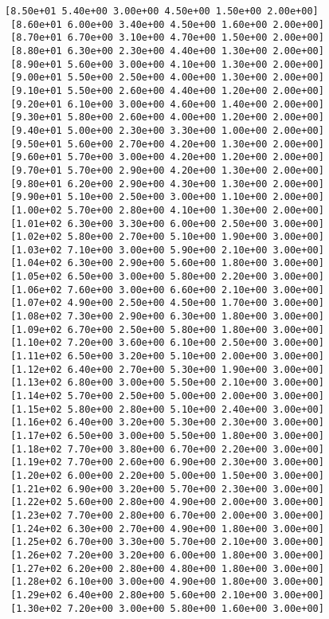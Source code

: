 \documentclass[11pt]{article}
\begin{document}
\begin{Verbatim}[commandchars=\\\{\}]
 [8.50e+01 5.40e+00 3.00e+00 4.50e+00 1.50e+00 2.00e+00]
 [8.60e+01 6.00e+00 3.40e+00 4.50e+00 1.60e+00 2.00e+00]
 [8.70e+01 6.70e+00 3.10e+00 4.70e+00 1.50e+00 2.00e+00]
 [8.80e+01 6.30e+00 2.30e+00 4.40e+00 1.30e+00 2.00e+00]
 [8.90e+01 5.60e+00 3.00e+00 4.10e+00 1.30e+00 2.00e+00]
 [9.00e+01 5.50e+00 2.50e+00 4.00e+00 1.30e+00 2.00e+00]
 [9.10e+01 5.50e+00 2.60e+00 4.40e+00 1.20e+00 2.00e+00]
 [9.20e+01 6.10e+00 3.00e+00 4.60e+00 1.40e+00 2.00e+00]
 [9.30e+01 5.80e+00 2.60e+00 4.00e+00 1.20e+00 2.00e+00]
 [9.40e+01 5.00e+00 2.30e+00 3.30e+00 1.00e+00 2.00e+00]
 [9.50e+01 5.60e+00 2.70e+00 4.20e+00 1.30e+00 2.00e+00]
 [9.60e+01 5.70e+00 3.00e+00 4.20e+00 1.20e+00 2.00e+00]
 [9.70e+01 5.70e+00 2.90e+00 4.20e+00 1.30e+00 2.00e+00]
 [9.80e+01 6.20e+00 2.90e+00 4.30e+00 1.30e+00 2.00e+00]
 [9.90e+01 5.10e+00 2.50e+00 3.00e+00 1.10e+00 2.00e+00]
 [1.00e+02 5.70e+00 2.80e+00 4.10e+00 1.30e+00 2.00e+00]
 [1.01e+02 6.30e+00 3.30e+00 6.00e+00 2.50e+00 3.00e+00]
 [1.02e+02 5.80e+00 2.70e+00 5.10e+00 1.90e+00 3.00e+00]
 [1.03e+02 7.10e+00 3.00e+00 5.90e+00 2.10e+00 3.00e+00]
 [1.04e+02 6.30e+00 2.90e+00 5.60e+00 1.80e+00 3.00e+00]
 [1.05e+02 6.50e+00 3.00e+00 5.80e+00 2.20e+00 3.00e+00]
 [1.06e+02 7.60e+00 3.00e+00 6.60e+00 2.10e+00 3.00e+00]
 [1.07e+02 4.90e+00 2.50e+00 4.50e+00 1.70e+00 3.00e+00]
 [1.08e+02 7.30e+00 2.90e+00 6.30e+00 1.80e+00 3.00e+00]
 [1.09e+02 6.70e+00 2.50e+00 5.80e+00 1.80e+00 3.00e+00]
 [1.10e+02 7.20e+00 3.60e+00 6.10e+00 2.50e+00 3.00e+00]
 [1.11e+02 6.50e+00 3.20e+00 5.10e+00 2.00e+00 3.00e+00]
 [1.12e+02 6.40e+00 2.70e+00 5.30e+00 1.90e+00 3.00e+00]
 [1.13e+02 6.80e+00 3.00e+00 5.50e+00 2.10e+00 3.00e+00]
 [1.14e+02 5.70e+00 2.50e+00 5.00e+00 2.00e+00 3.00e+00]
 [1.15e+02 5.80e+00 2.80e+00 5.10e+00 2.40e+00 3.00e+00]
 [1.16e+02 6.40e+00 3.20e+00 5.30e+00 2.30e+00 3.00e+00]
 [1.17e+02 6.50e+00 3.00e+00 5.50e+00 1.80e+00 3.00e+00]
 [1.18e+02 7.70e+00 3.80e+00 6.70e+00 2.20e+00 3.00e+00]
 [1.19e+02 7.70e+00 2.60e+00 6.90e+00 2.30e+00 3.00e+00]
 [1.20e+02 6.00e+00 2.20e+00 5.00e+00 1.50e+00 3.00e+00]
 [1.21e+02 6.90e+00 3.20e+00 5.70e+00 2.30e+00 3.00e+00]
 [1.22e+02 5.60e+00 2.80e+00 4.90e+00 2.00e+00 3.00e+00]
 [1.23e+02 7.70e+00 2.80e+00 6.70e+00 2.00e+00 3.00e+00]
 [1.24e+02 6.30e+00 2.70e+00 4.90e+00 1.80e+00 3.00e+00]
 [1.25e+02 6.70e+00 3.30e+00 5.70e+00 2.10e+00 3.00e+00]
 [1.26e+02 7.20e+00 3.20e+00 6.00e+00 1.80e+00 3.00e+00]
 [1.27e+02 6.20e+00 2.80e+00 4.80e+00 1.80e+00 3.00e+00]
 [1.28e+02 6.10e+00 3.00e+00 4.90e+00 1.80e+00 3.00e+00]
 [1.29e+02 6.40e+00 2.80e+00 5.60e+00 2.10e+00 3.00e+00]
 [1.30e+02 7.20e+00 3.00e+00 5.80e+00 1.60e+00 3.00e+00]

\end{Verbatim}
\end{document}
